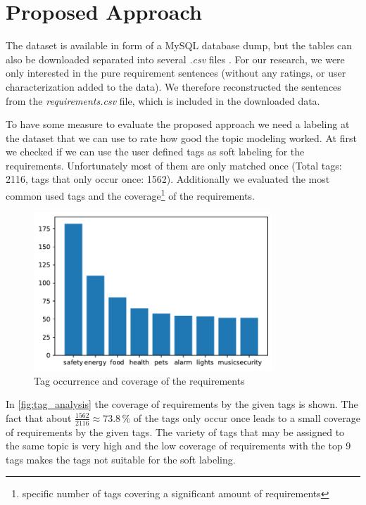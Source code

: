 \section{Proposed Approach} %
\label{sec:own_approach}

The \crowdre{} dataset is available in form of a MySQL database dump, but the tables can also be downloaded separated into several \textit{.csv} files \cite{crowdre_dataset}. For our research, we were only interested in the pure requirement sentences (without any ratings, or user characterization added to the data). We therefore reconstructed the sentences from the \textit{requirements.csv} file, which is included in the downloaded data.

To have some measure to evaluate the proposed approach we need a labeling at the dataset that we can use to rate how good the topic modeling worked. At first we checked if we can use the user defined tags as soft labeling for the requirements. Unfortunately most of them are only matched once (Total tags: 2116, tags that only occur once: 1562). Additionally we evaluated the most common used tags and the coverage\footnote{specific number of tags covering a significant amount of requirements} of the requirements.

\begin{figure}[ht]
  \centering
    \includegraphics[width=0.8\textwidth]{screenshots/tag_analysis.pdf}
    \caption{Tag occurrence and coverage of the requirements}
    \label{fig:tag_analysis}
\end{figure}
\FloatBarrier

In \autoref{fig:tag_analysis} the coverage of requirements by the given tags is shown. The fact that about $\frac{1562}{2116}\approx73.8\,\%$ of the tags only occur once leads to a small coverage of requirements by the given tags. The variety of tags that may be assigned to the same topic is very high and the low coverage of requirements with the top 9 tags makes the tags not suitable for the soft labeling. 

